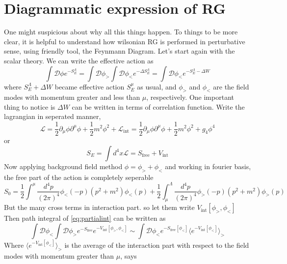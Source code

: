 \documentclass[12pt,halfline,a4paper]{ouparticle}
\begin{document}
\section{Diagrammatic expression of RG}
\label{sec3}
One might suspicious about why all this things happen. To things to be more clear, it is helpful to understand how wilsonian RG is performed in perturbative sense, using friendly tool,
the Feynmann Diagram.
Let's start again with the scalar theory. We can write the effective action as
\begin{equation}
	\label{eq:partialint}
\int \mathcal D \phi e^{-S_E^\Lambda}=\int \mathcal D \phi_> \int \mathcal D \phi_< e^{-\Delta S_E^\Lambda}=\int \mathcal D \phi_< e^{-S_E^{\Lambda}-\Delta W}
\end{equation}
where $S_E^\Lambda+\Delta W$ became effective action $S_E^\mu$ as usual, and $\phi_>$ and $\phi_<$ are the field modes with momentum greater and less than $\mu$, respectively.
One important thing to notice is $\Delta W$ can be written in terms of correlation function. Write the lagrangian in seperated manner,
\begin{equation}
	\mathcal L=\frac{1}{2}\partial_\mu\phi\partial^\mu\phi +\frac{1}{2}m^2\phi^2 +\mathcal L_{\text{int}}=\frac{1}{2}\partial_\mu\phi\partial^\mu\phi +\frac{1}{2}m^2\phi^2 + g_4\phi^4 
\end{equation}
or 
\begin{equation}
	S_E = \int d^4x \mathcal L = S_\text{free}+V_\text{int}
\end{equation}
Now applying background field method $\phi=\phi_>+\phi_<$ and working in fourier basis, the free part of the action is completely seperable
\begin{equation}
	\label{eq:sepaction}
	S_0 = \frac{1}{2}\int^\mu \frac{d^4p}{(2\pi)^4}\phi_<(-p)(p^2+m^2)\phi_<(p)+\frac{1}{2}\int^\Lambda_\mu \frac{d^4p}{(2\pi)^4}\phi_>(-p)(p^2+m^2)\phi_>(p)
\end{equation}
But the many cross terms in interaction part. so let them write $V_\text{int}[\phi_>,\phi_<]$
Then path integral of \ref{eq:partialint} can be written as
\begin{equation}
	\int \mathcal D \phi_<\int \mathcal D \phi_> e^{-S_\text{free}}e^{-V_\text{int}[\phi_>,\phi_<]}\sim\int \mathcal D \phi_< e^{-S_\text{free}[\phi_<]}\langle e^{-V_\text{int}[\phi_<]}\rangle_>
	\end{equation}
Where $\langle e^{-V_\text{int}[\phi_<]}\rangle_>$ is the average of the interaction part with respect to the field modes with momentum greater than $\mu$, says
\end{document}
